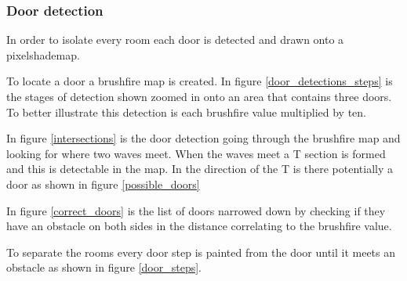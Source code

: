 \subsubsection{Door detection}
In order to isolate every room each door is detected and drawn onto a pixelshademap.

To locate a door a brushfire map is created. 
In figure \ref{door_detections_steps} is the stages of detection shown zoomed in onto an area that contains three doors.
To better illustrate this detection is each brushfire value multiplied by ten.

In figure \ref{intersections} is the door detection going through the brushfire map and looking for where two waves meet.
When the waves meet a T section is formed and this is detectable in the map. 
In the direction of the T is there potentially a door as shown in figure \ref{possible_doors}

In figure \ref{correct_doors} is the list of doors narrowed down by checking if they have an obstacle on both sides in the distance correlating to the brushfire value.

To separate the rooms every door step is painted from the door until it meets an obstacle as shown in figure \ref{door_steps}.


